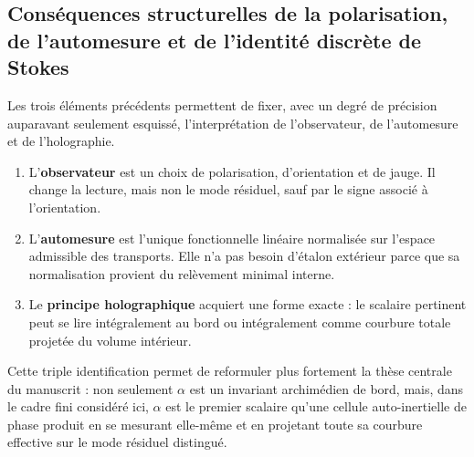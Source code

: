\subsection{Conséquences structurelles de la polarisation, de l'automesure et de l'identité discrète de Stokes}

Les trois éléments précédents permettent de fixer, avec un degré de précision auparavant seulement esquissé,
l'interprétation de l'observateur, de l'automesure et de l'holographie.

\begin{enumerate}[label=\textup{(\arabic*)}]
\item L'\textbf{observateur} est un choix de polarisation, d'orientation et de jauge. Il change la lecture,
mais non le mode résiduel, sauf par le signe associé à l'orientation.
\item L'\textbf{automesure} est l'unique fonctionnelle linéaire normalisée sur l'espace admissible des
transports. Elle n'a pas besoin d'étalon extérieur parce que sa normalisation provient du relèvement minimal interne.
\item Le \textbf{principe holographique} acquiert une forme exacte : le scalaire pertinent peut se lire
intégralement au bord ou intégralement comme courbure totale projetée du volume intérieur.
\end{enumerate}

Cette triple identification permet de reformuler plus fortement la thèse centrale du manuscrit :
non seulement $\alpha$ est un invariant archimédien de bord, mais, dans le cadre fini
considéré ici, $\alpha$ est le premier scalaire qu'une cellule auto-inertielle de phase produit en
se mesurant elle-même et en projetant toute sa courbure effective sur le mode résiduel distingué.
